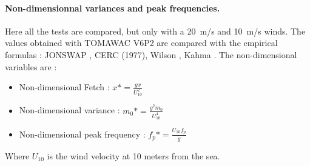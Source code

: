 \paragraph{Non-dimensionnal variances and peak frequencies.}
Here all the tests are compared, but only with a 20~m/s and 10~m/s winds. The values obtained with TOMAWAC V6P2 are compared with the empirical formulas : JONSWAP \cite{Hasselmann1973}, CERC (1977)\cite {CERC77}, Wilson \cite{Wilson1965}, Kahma \cite{Kahma1992}. The non-dimensional variables are :\\
\begin{itemize}
\item Non-dimensional Fetch : $x* = \frac{g x}{U_{10}^2}$
\item Non-dimensional variance : $m_{0}* = \frac{g^2 m_{0}}{U_{10}^4}$
\item Non-dimensional peak frequency : $f_{p}* = \frac{U_{10} f_{p}}{g}$
\end{itemize}
Where $U_{10}$ is the wind velocity at 10 meters from the sea.\\
